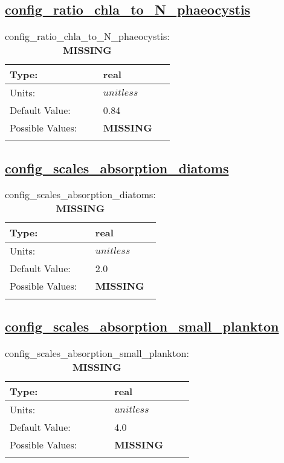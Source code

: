 \subsection[config\_ratio\_chla\_to\_N\_phaeocystis]{\hyperref[sec:nm_tab_biogeochemistry]{config\_ratio\_chla\_to\_N\_phaeocystis}}
\label{subsec:nm_sec_config_ratio_chla_to_N_phaeocystis}
\begin{center}
\begin{longtable}{| p{2.0in} || p{4.0in} |}
    \hline
    Type: & real \\
    \hline
    Units: & $unitless$ \\
    \hline
    Default Value: & 0.84 \\
    \hline
    Possible Values: & {\bf \color{red} MISSING} \\
    \hline
    \caption{config\_ratio\_chla\_to\_N\_phaeocystis: {\bf \color{red} MISSING}}
\end{longtable}
\end{center}
\subsection[config\_scales\_absorption\_diatoms]{\hyperref[sec:nm_tab_biogeochemistry]{config\_scales\_absorption\_diatoms}}
\label{subsec:nm_sec_config_scales_absorption_diatoms}
\begin{center}
\begin{longtable}{| p{2.0in} || p{4.0in} |}
    \hline
    Type: & real \\
    \hline
    Units: & $unitless$ \\
    \hline
    Default Value: & 2.0 \\
    \hline
    Possible Values: & {\bf \color{red} MISSING} \\
    \hline
    \caption{config\_scales\_absorption\_diatoms: {\bf \color{red} MISSING}}
\end{longtable}
\end{center}
\subsection[config\_scales\_absorption\_small\_plankton]{\hyperref[sec:nm_tab_biogeochemistry]{config\_scales\_absorption\_small\_plankton}}
\label{subsec:nm_sec_config_scales_absorption_small_plankton}
\begin{center}
\begin{longtable}{| p{2.0in} || p{4.0in} |}
    \hline
    Type: & real \\
    \hline
    Units: & $unitless$ \\
    \hline
    Default Value: & 4.0 \\
    \hline
    Possible Values: & {\bf \color{red} MISSING} \\
    \hline
    \caption{config\_scales\_absorption\_small\_plankton: {\bf \color{red} MISSING}}
\end{longtable}
\end{center}

